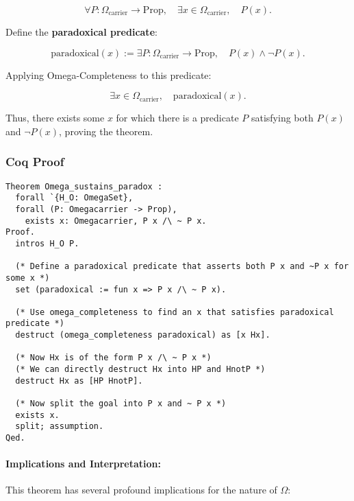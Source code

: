 \documentclass[12pt]{article}
\begin{document}
\begin{equation}
    \forall P: \Omega_{\text{carrier}} \to \text{Prop}, \quad
    \exists x \in \Omega_{\text{carrier}}, \quad P(x).
\end{equation}

Define the \textbf{paradoxical predicate}:

\begin{equation}
    \text{paradoxical}(x) := \exists P: \Omega_{\text{carrier}} \to \text{Prop}, \quad P(x) \wedge \neg P(x).
\end{equation}

Applying Omega-Completeness to this predicate:

\begin{equation}
    \exists x \in \Omega_{\text{carrier}}, \quad \text{paradoxical}(x).
\end{equation}

Thus, there exists some \( x \) for which there is a predicate \( P \) satisfying both \( P(x) \) and \( \neg P(x) \), proving the theorem.

\subsubsection{Coq Proof}
\begin{lstlisting}[language=Coq]
Theorem Omega_sustains_paradox :
  forall `{H_O: OmegaSet},
  forall (P: Omegacarrier -> Prop),
    exists x: Omegacarrier, P x /\ ~ P x.
Proof.
  intros H_O P.
  
  (* Define a paradoxical predicate that asserts both P x and ~P x for some x *)
  set (paradoxical := fun x => P x /\ ~ P x).
  
  (* Use omega_completeness to find an x that satisfies paradoxical predicate *)
  destruct (omega_completeness paradoxical) as [x Hx].
  
  (* Now Hx is of the form P x /\ ~ P x *)
  (* We can directly destruct Hx into HP and HnotP *)
  destruct Hx as [HP HnotP].
  
  (* Now split the goal into P x and ~ P x *)
  exists x. 
  split; assumption.
Qed.
\end{lstlisting}

\paragraph{Implications and Interpretation:}
This theorem has several profound implications for the nature of \( \Omega \):
\end{document}
